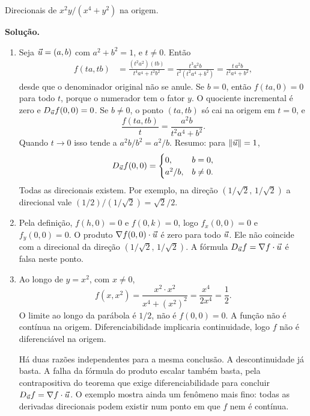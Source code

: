 \documentclass[11pt,a4paper]{article}
\begin{document}
\begin{exercicio}
Direcionais de $x^2 y/(x^4+y^2)$ na origem.

\textbf{Solução.}
\begin{enumerate}[label=\alph*)]
\item Seja $\vec{u}=(a,b)$ com $a^2+b^2=1$, e $t\neq 0$. Então
\begin{align*}
f(ta,tb)
&=\frac{(t^2 a^2)(tb)}{t^4 a^4+t^2 b^2}
=\frac{t^3 a^2 b}{t^2(t^2 a^4+b^2)}
=\frac{t\, a^2 b}{t^2 a^4+b^2},
\end{align*}
desde que o denominador original não se anule. Se $b=0$, então $f(ta,0)=0$ para todo $t$, porque o numerador tem o fator $y$. O quociente incremental é zero e $D_{\vec{u}} f(0,0)=0$. Se $b\neq 0$, o ponto $(ta,tb)$ só cai na origem em $t=0$, e
\[
\frac{f(ta,tb)}{t}=\frac{a^2 b}{t^2 a^4+b^2}.
\]
Quando $t\to 0$ isso tende a $a^2 b/b^2=a^2/b$. Resumo: para $\left\lVert \vec{u} \right\rVert=1$,
\[
D_{\vec{u}} f(0,0)=\begin{cases}
0, & b=0,\\
a^2/b, & b\neq 0.
\end{cases}
\]
Todas as direcionais existem. Por exemplo, na direção $(1/\sqrt{2},\,1/\sqrt{2})$ a direcional vale $(1/2)/(1/\sqrt{2})=\sqrt{2}/2$.

\item Pela definição, $f(h,0)=0$ e $f(0,k)=0$, logo $f_x(0,0)=0$ e $f_y(0,0)=0$. O produto $\nabla f(0,0)\cdot\vec{u}$ é zero para todo $\vec{u}$. Ele não coincide com a direcional da direção $(1/\sqrt{2},\,1/\sqrt{2})$. A fórmula $D_{\vec{u}} f=\nabla f\cdot\vec{u}$ é falsa neste ponto.

\item Ao longo de $y=x^2$, com $x\neq 0$,
\[
f(x,x^2)=\frac{x^2\cdot x^2}{x^4+(x^2)^2}=\frac{x^4}{2x^4}=\frac{1}{2}.
\]
O limite ao longo da parábola é $1/2$, não é $f(0,0)=0$. A função não é contínua na origem. Diferenciabilidade implicaria continuidade, logo $f$ não é diferenciável na origem.

Há duas razões independentes para a mesma conclusão. A descontinuidade já basta. A falha da fórmula do produto escalar também basta, pela contrapositiva do teorema que exige diferenciabilidade para concluir $D_{\vec{u}} f=\nabla f\cdot\vec{u}$. O exemplo mostra ainda um fenômeno mais fino: todas as derivadas direcionais podem existir num ponto em que $f$ nem é contínua.
\end{enumerate}
\end{exercicio}
\end{document}
